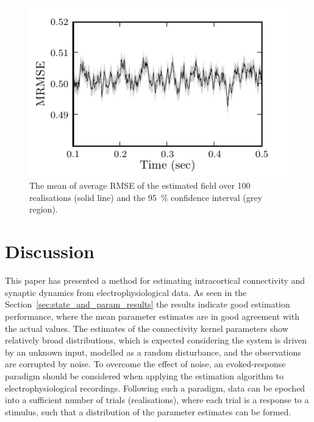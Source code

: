 \documentclass[10pt]{article}
\begin{document}
  \begin{figure}
   	\begin{center}
   		\includegraphics{./Graph/MRMSE.pdf} 
   	\end{center}
   	\caption{The mean of average RMSE of the estimated field over 100 realisations (solid line) and the 95~\% confidence interval (grey region).} 
\label{fig:RMSE}
   \end{figure}
  

\section*{Discussion}\label{DiscussionSection}
This paper has presented a method for estimating intracortical connectivity and synaptic dynamics from electrophysiological data. As seen in the Section~\ref{sec:state_and_param_results} the results indicate good estimation performance, where the mean parameter estimates are in good agreement with the actual values. The estimates of the connectivity kernel parameters show relatively broad distributions, which is expected considering the system is driven by an unknown input, modelled as a random disturbance, and the observations are corrupted by noise. To overcome the effect of noise, an evoked-response paradigm should be considered when applying the estimation algorithm to electrophysiological recordings. Following such a paradigm, data can be epoched into a sufficient number of trials (realisations), where each trial is a response to a stimulus, such that a distribution of the parameter estimates can be formed.
\end{document}
